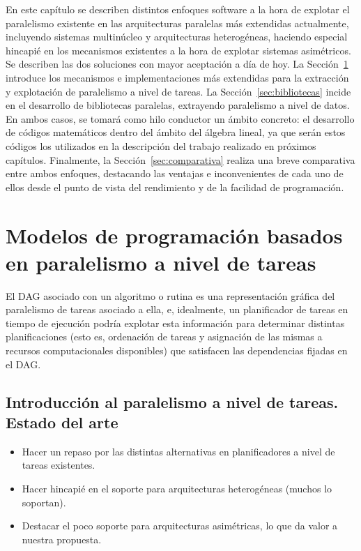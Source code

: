 En este capítulo se describen distintos enfoques software a la hora de explotar el paralelismo 
existente en las arquitecturas paralelas más extendidas actualmente, incluyendo sistemas multinúcleo y 
arquitecturas heterogéneas, haciendo especial hincapié en los mecanismos existentes a la hora de
explotar sistemas asimétricos. Se describen las dos soluciones con mayor aceptación a día de hoy. 
La Sección~\ref{sec:tareas} introduce los mecanismos e implementaciones más extendidas para la
extracción y explotación de paralelismo a nivel de tareas. 
La Sección~\ref{sec:bibliotecas} incide en el desarrollo de bibliotecas paralelas, extrayendo
paralelismo a nivel de datos.
En ambos casos, se tomará como hilo conductor un ámbito concreto: el desarrollo de códigos matemáticos
dentro del ámbito del álgebra lineal, ya que serán estos códigos los utilizados en la descripción
del trabajo realizado en próximos capítulos.
Finalmente, la Sección~\ref{sec:comparativa} realiza una breve comparativa entre ambos enfoques,
destacando las ventajas e inconvenientes de cada uno de ellos desde el punto de vista del rendimiento
y de la facilidad de programación.


\section{Modelos de programación basados en paralelismo a nivel de tareas}
\label{sec:tareas}

El DAG asociado con un algoritmo o rutina es una representación gráfica del paralelismo de tareas asociado a ella,
e, idealmente, un planificador de tareas en tiempo de ejecución podría explotar esta información para determinar
distintas planificaciones (esto es, ordenación de tareas y asignación de las mismas a recursos computacionales
disponibles) que satisfacen las dependencias fijadas en el DAG.

\subsection{Introducción al paralelismo a nivel de tareas. Estado del arte}

\begin{itemize}

\item Hacer un repaso por las distintas alternativas en planificadores a nivel de tareas existentes.

\item Hacer hincapié en el soporte para arquitecturas heterogéneas (muchos lo soportan).

\item Destacar el poco soporte para arquitecturas asimétricas, lo que da valor a nuestra propuesta.

\end{itemize}

